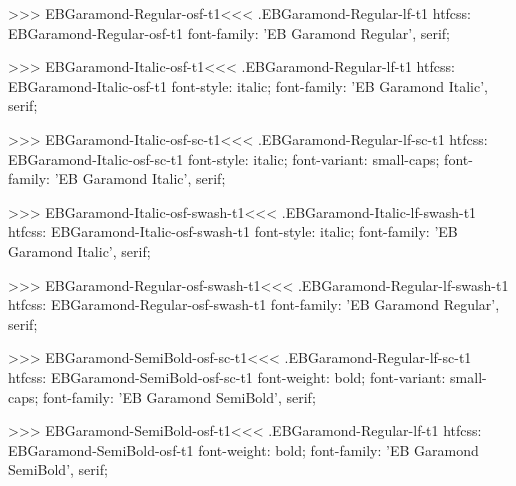 {{{{{{{>>>
\<EBGaramond-Regular-osf-t1\><<<
.EBGaramond-Regular-lf-t1
htfcss:  EBGaramond-Regular-osf-t1  font-family: 'EB Garamond Regular', serif;

>>>
\<EBGaramond-Italic-osf-t1\><<<
.EBGaramond-Regular-lf-t1
htfcss:  EBGaramond-Italic-osf-t1  font-style: italic; font-family: 'EB Garamond Italic', serif;

>>>
\<EBGaramond-Italic-osf-sc-t1\><<<
.EBGaramond-Regular-lf-sc-t1
htfcss:  EBGaramond-Italic-osf-sc-t1  font-style: italic; font-variant: small-caps; font-family: 'EB Garamond Italic', serif;

>>>
\<EBGaramond-Italic-osf-swash-t1\><<<
.EBGaramond-Italic-lf-swash-t1
htfcss:  EBGaramond-Italic-osf-swash-t1  font-style: italic; font-family: 'EB Garamond Italic', serif;

>>>
\<EBGaramond-Regular-osf-swash-t1\><<<
.EBGaramond-Regular-lf-swash-t1
htfcss:  EBGaramond-Regular-osf-swash-t1  font-family: 'EB Garamond Regular', serif;

>>>
\<EBGaramond-SemiBold-osf-sc-t1\><<<
.EBGaramond-Regular-lf-sc-t1
htfcss:  EBGaramond-SemiBold-osf-sc-t1  font-weight: bold; font-variant: small-caps; font-family: 'EB Garamond SemiBold', serif;

>>>
\<EBGaramond-SemiBold-osf-t1\><<<
.EBGaramond-Regular-lf-t1
htfcss:  EBGaramond-SemiBold-osf-t1  font-weight: bold; font-family: 'EB Garamond SemiBold', serif;

}}}}}}}
